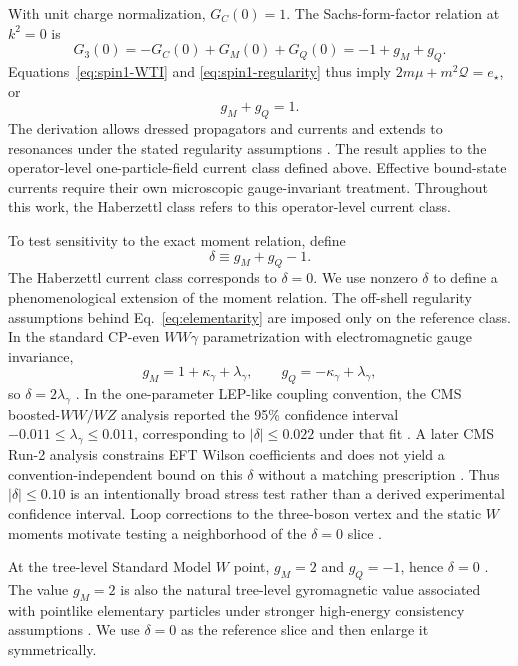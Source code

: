 \documentclass[12pt]{iopjournal}
\theoremstyle{definition}
\theoremstyle{remark}
\begin{document}
With unit charge normalization, $G_C(0)=1$. The Sachs-form-factor relation at $k^2=0$ is
\begin{equation}
G_3(0)=-G_C(0)+G_M(0)+G_Q(0)=-1+g_M+g_Q.
\end{equation}
Equations~\eqref{eq:spin1-WTI} and \eqref{eq:spin1-regularity} thus imply $2m\mu+m^2\mathcal Q=e_\star$, or
\begin{equation}
\boxed{g_M+g_Q=1.}
\label{eq:elementarity}
\end{equation}
The derivation allows dressed propagators and currents and extends to resonances under the stated regularity assumptions \cite{Haberzettl2019}. The result applies to the operator-level one-particle-field current class defined above. Effective bound-state currents require their own microscopic gauge-invariant treatment. Throughout this work, the Haberzettl class refers to this operator-level current class.

To test sensitivity to the exact moment relation, define
\begin{equation}
\delta\equiv g_M+g_Q-1.
\label{eq:delta-definition}
\end{equation}
The Haberzettl current class corresponds to $\delta=0$. We use nonzero $\delta$ to define a phenomenological extension of the moment relation. The off-shell regularity assumptions behind Eq.~\eqref{eq:elementarity} are imposed only on the reference class. In the standard CP-even $WW\gamma$ parametrization with electromagnetic gauge invariance,
\begin{equation}
g_M=1+\kappa_\gamma+\lambda_\gamma,
\qquad
g_Q=-\kappa_\gamma+\lambda_\gamma,
\end{equation}
so $\delta=2\lambda_\gamma$ \cite{HagiwaraPecceiZeppenfeldHikasa1987}. In the one-parameter LEP-like coupling convention, the CMS boosted-$WW/WZ$ analysis reported the 95\% confidence interval $-0.011\le\lambda_\gamma\le0.011$, corresponding to $|\delta|\le0.022$ under that fit \cite{CMS2017ChargedTGC}. A later CMS Run-2 analysis constrains EFT Wilson coefficients and does not yield a convention-independent bound on this $\delta$ without a matching prescription \cite{CMS2026EFT}. Thus $|\delta|\le0.10$ is an intentionally broad stress test rather than a derived experimental confidence interval. Loop corrections to the three-boson vertex and the static $W$ moments motivate testing a neighborhood of the $\delta=0$ slice \cite{PapavassiliouPhilippides1993}.

At the tree-level Standard Model $W$ point, $g_M=2$ and $g_Q=-1$, hence $\delta=0$ \cite{HagiwaraPecceiZeppenfeldHikasa1987,BrodskyHiller1992}. The value $g_M=2$ is also the natural tree-level gyromagnetic value associated with pointlike elementary particles under stronger high-energy consistency assumptions \cite{FerraraPorratiTelegdi1992}. We use $\delta=0$ as the reference slice and then enlarge it symmetrically.
\end{document}
